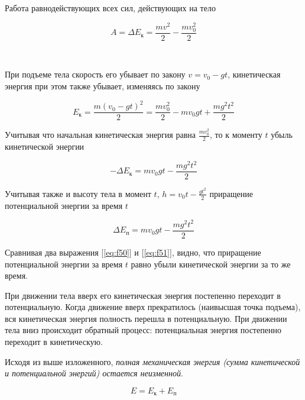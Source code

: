 \documentclass[a4paper,12pt]{article}
\begin{document}
		Работа равнодействующих всех сил, действующих на тело

		\begin{equation}
			A = \Delta E_{\text{к}} = \frac{mv^2}{2} - \frac{mv_0^2}{2}
		\end{equation}

		\

		При подъеме тела скорость его убывает по закону $v = v_0-gt$, кинетическая энергия
		при этом также убывает, изменяясь по закону

		\begin{equation}
			E_{\text{к}} = \frac{m(v_0-gt)^2}{2} = \frac{mv_0^2}{2} - mv_0gt + \frac{mg^2t^2}{2}
		\end{equation}

		Учитывая что начальная кинетическая энергия равна $\frac{mv_0^2}{2}$, то к моменту $t$ убыль
		кинетической энергии

		\begin{equation}
			\label{eq:f50}
			-\Delta E_{\text{к}} = mv_0gt - \frac{mg^2t^2}{2}
		\end{equation}

		Учитывая также и высоту тела в момент $t$,  $h = v_0t - \frac{gt^2}{2}$ приращение 
		потенциальной энергии за время $t$

		\begin{equation}
			\label{eq:f51}
			\Delta E_{\text{п}} = mv_0gt - \frac{mg^2t^2}{2}
		\end{equation}

		Сравнивая два выражения [\ref{eq:f50}] и [\ref{eq:f51}], видно, что приращение потенциальной
		энергии за время $t$ равно убыли кинетической энергии за то же время.

		При движении тела вверх его кинетическая энергия постепенно переходит в потенциальную.
		Когда движение вверх прекратилось (наивысшая точка подъема), вся кинетическая энергия
		полность перешла в потенциальную. При движении тела вниз происходит обратный процесс:
		потенциальная энергия постепенно переходит в кинетическую.

		Исходя из выше изложенного, \textit{полная механическая энергия (сумма кинетической и 
		потенциальной энергий) остается неизменной}.

		\begin{equation}
			E = E_{\text{к}} + E_{\text{п}}
		\end{equation}

		\
\end{document}
